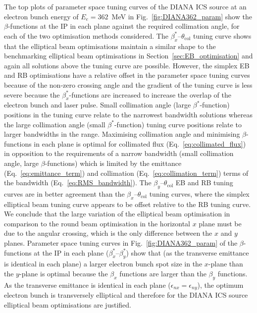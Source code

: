 \documentclass[../main.tex]{subfiles}
\begin{document}
The top plots of parameter space tuning curves of the DIANA ICS source at an electron bunch energy of $E_{e}=362$~\si{\mega\electronvolt} in Fig.~\ref{fig:DIANA362_param} show the $\beta$-functions at the IP in each plane against the required collimation angle, for each of the two optimisation methods considered. The $\beta_{x}^{*}$--$\theta_{\mathrm{col}}$ tuning curve shows that the elliptical beam optimisations maintain a similar shape to the benchmarking elliptical beam optimisations in Section~\ref{sec:EB_optimisation} and again all solutions above the tuning curve are possible. However, the simplex EB and RB optimisations have a relative offset in the parameter space tuning curves because of the non-zero crossing angle and the gradient of the tuning curve is less severe because the $\beta_{x}^{*}$-functions are increased to increase the overlap of the electron bunch and laser pulse. Small collimation angle (large $\beta^{*}$-function) positions in the tuning curve relate to the narrowest bandwidth solutions whereas the large collimation angle (small $\beta^{*}$-function) tuning curve positions relate to larger bandwidths in the range. Maximising collimation angle and minimising $\beta$-functions in each plane is optimal for collimated flux (Eq.~\ref{eq:collimated_flux}) in opposition to the requirements of a narrow bandwidth (small collimation angle, large $\beta$-functions) which is limited by the emittance (Eq.~\ref{eq:emittance_term}) and collimation (Eq.~\ref{eq:collimation_term}) terms of the bandwidth (Eq.~\ref{eq:RMS_bandwidth}). The $\beta_{y}$--$\theta_{\mathrm{col}}$ EB and RB tuning curves are in better agreement than the $\beta_{x}$--$\theta_{\mathrm{col}}$ tuning curves, where the simplex elliptical beam tuning curve appears to be offset relative to the RB tuning curve. We conclude that the large variation of the elliptical beam optimisation in comparison to the round beam optimisation in the horizontal $x$ plane must be due to the angular crossing, which is the only difference between the $x$ and $y$ planes. Parameter space tuning curves in Fig.~\ref{fig:DIANA362_param} of the $\beta$-functions at the IP in each plane ($\beta_{x}^{*}$--$\beta_{y}^{*}$) show that (as the transverse emittance is identical in each plane) a larger electron bunch spot size in the $x$-plane than the $y$-plane is optimal because the $\beta_{x}$ functions are larger than the $\beta_{y}$ functions. As the transverse emittance is identical in each plane ($\epsilon_{nx} = \epsilon_{ny}$), the optimum electron bunch is transversely elliptical and therefore for the DIANA ICS source elliptical beam optimisations are justified.
\end{document}
